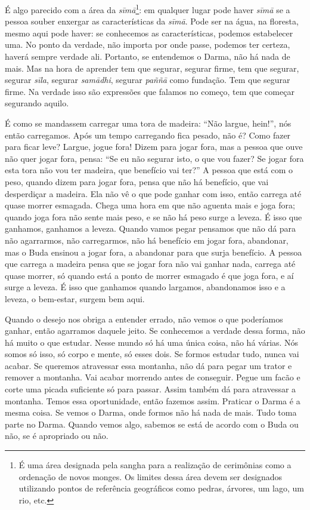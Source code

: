 É algo parecido com a área da \textit{sīmā}\footnote{É uma área
designada pela sangha para a realização de cerimônias como a ordenação
de novos monges. Os limites dessa área devem ser designados utilizando
pontos de referência geográficos como pedras, árvores, um lago, um rio,
etc.}: em qualquer lugar pode haver \textit{sīmā} se a pessoa
souber enxergar as características da \textit{sīmā}. Pode ser na
água, na floresta, mesmo aqui pode haver: se conhecemos as
características, podemos estabelecer uma. No ponto da verdade, não
importa por onde passe, podemos ter certeza, haverá sempre verdade ali.
Portanto, se entendemos o Darma, não há nada de mais. Mas na hora de
aprender tem que segurar, segurar firme, tem que segurar, segurar
\textit{sīla}, segurar \textit{samādhi}, segurar \textit{paññā}
como fundação. Tem que segurar firme. Na verdade isso são expressões
que falamos no começo, tem que começar segurando aquilo. 

É como se mandassem carregar uma tora de madeira: “Não largue,
hein!”, nós então carregamos. Após um tempo carregando fica pesado, não
é? Como fazer para ficar leve? Largue, jogue fora! Dizem para jogar
fora, mas a pessoa que ouve não quer jogar fora, pensa: “Se eu não
segurar isto, o que vou fazer? Se jogar fora esta tora não vou ter
madeira, que benefício vai ter?” A pessoa que está com o peso, quando
dizem para jogar fora, pensa que não há benefício, que vai desperdiçar
a madeira. Ela não vê o que pode ganhar com isso, então carrega até
quase morrer esmagada. Chega uma hora em que não aguenta mais e joga
fora; quando joga fora não sente mais peso, e se não há peso surge a
leveza. É isso que ganhamos, ganhamos a leveza. Quando vamos pegar
pensamos que não dá para não agarrarmos, não carregarmos, não há
benefício em jogar fora, abandonar, mas o Buda ensinou a jogar fora, a
abandonar para que surja benefício. A pessoa que carrega a madeira
pensa que se jogar fora não vai ganhar nada, carrega até quase morrer,
só quando está a ponto de morrer esmagado é que joga fora, e aí surge a
leveza. É isso que ganhamos quando largamos, abandonamos isso e a
leveza, o bem-estar, surgem bem aqui. 

Quando o desejo nos obriga a entender errado, não vemos o que
poderíamos ganhar, então agarramos daquele jeito. Se conhecemos a
verdade dessa forma, não há muito o que estudar. Nesse mundo só há uma
única coisa, não há várias. Nós somos só isso, só corpo e mente, só
esses dois. Se formos estudar tudo, nunca vai acabar. Se queremos
atravessar essa montanha, não dá para pegar um trator e remover a
montanha. Vai acabar morrendo antes de conseguir. Pegue um facão e
corte uma picada suficiente só para passar. Assim também dá para
atravessar a montanha. Temos essa oportunidade, então fazemos assim.
Praticar o Darma é a mesma coisa. Se vemos o Darma, onde formos não há
nada de mais. Tudo toma parte no Darma. Quando vemos algo, sabemos se
está de acordo com o Buda ou não, se é apropriado ou não. 

